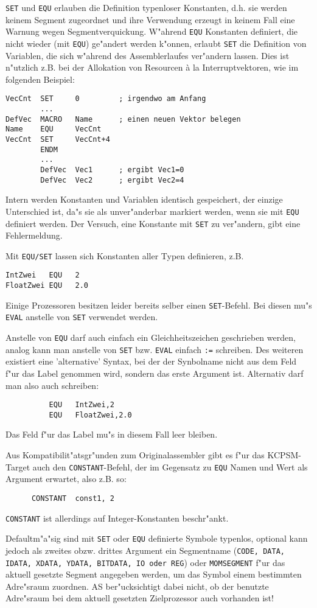 \documentclass[12pt,a4paper,twoside]{report}
\newcommand{\tty}[1]{{\tt #1}}
\begin{document}
\tty{SET} und \tty{EQU} erlauben die Definition typenloser Konstanten, d.h. sie
werden keinem Segment zugeordnet und ihre Verwendung erzeugt in keinem
Fall eine Warnung wegen Segmentverquickung.  W"ahrend \tty{EQU} Konstanten
definiert, die nicht wieder (mit \tty{EQU}) ge"andert werden k"onnen, erlaubt
\tty{SET} die Definition von Variablen, die sich w"ahrend des Assemblerlaufes
ver"andern lassen.  Dies ist n"utzlich z.B. bei der Allokation von
Resourcen \`a la Interruptvektoren, wie im folgenden Beispiel:
\begin{verbatim}
VecCnt  SET     0         ; irgendwo am Anfang
        ...
DefVec  MACRO   Name      ; einen neuen Vektor belegen
Name    EQU     VecCnt
VecCnt  SET     VecCnt+4
        ENDM
        ...
        DefVec  Vec1      ; ergibt Vec1=0
        DefVec  Vec2      ; ergibt Vec2=4
\end{verbatim}
Intern werden Konstanten und Variablen identisch gespeichert, der
einzige Unterschied ist, da"s sie als unver"anderbar markiert werden, wenn
sie mit \tty{EQU} definiert werden.  Der Versuch, eine Konstante mit
\tty{SET} zu ver"andern, gibt eine Fehlermeldung.
\par
Mit \tty{EQU/SET} lassen sich Konstanten aller Typen definieren, z.B.
\begin{verbatim}
IntZwei   EQU   2
FloatZwei EQU   2.0
\end{verbatim}
Einige Prozessoren besitzen leider bereits selber einen \tty{SET}-Befehl.
Bei diesen mu"s \tty{EVAL} anstelle von \tty{SET} verwendet werden.
\par
Anstelle von \tty{EQU} darf auch einfach ein Gleichheitszeichen geschrieben
werden, analog kann man anstelle von \tty{SET} bzw. \tty{EVAL}
einfach \tty{:=} schreiben.  Des weiteren existiert eine
'alternative' Syntax, bei der der Synbolname nicht aus dem Feld
f"ur das Label genommen wird, sondern das erste Argument ist. 
Alternativ darf man also auch schreiben:
\begin{verbatim}
          EQU   IntZwei,2
          EQU   FloatZwei,2.0
\end{verbatim}
Das Feld f"ur das Label mu"s in diesem Fall leer bleiben.
\par
Aus Kompatibilit"atsgr"unden zum Originalassembler gibt es f"ur das
KCPSM-Target auch den {\tt CONSTANT}-Befehl, der im Gegensatz zu {\tt EQU}
Namen und Wert als Argument erwartet, also z.B. so:
\begin{verbatim}
      CONSTANT  const1, 2
\end{verbatim}
{\tt CONSTANT} ist allerdings auf Integer-Konstanten beschr"ankt.
\par
Defaultm"a"sig sind mit \tty{SET} oder \tty{EQU} definierte Symbole
typenlos, optional kann jedoch als zweites obzw. drittes Argument ein
Segmentname (\tty{CODE, DATA, IDATA, XDATA, YDATA, BITDATA, IO oder REG})
oder \tty{MOMSEGMENT} f"ur das aktuell gesetzte Segment angegeben werden,
um das Symbol einem bestimmten Adre"sraum zuordnen.  AS ber"ucksichtigt
dabei nicht, ob der benutzte Adre"sraum bei dem aktuell gesetzten
Zielprozessor auch vorhanden ist!
\end{document}
